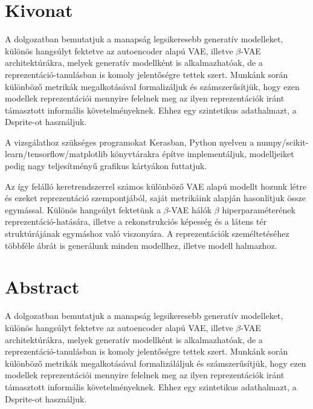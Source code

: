 \chapter*{Kivonat}

A dolgozatban bemutatjuk a manapság legsikeresebb generatív modelleket, különös hangsúlyt fektetve az autoencoder alapú VAE, illetve $\beta$-VAE architektúrákra, melyek generatív modellként is alkalmazhatóak, de a reprezentáció-tanulásban is komoly jelentőségre tettek szert. Munkánk során különböző metrikák megalkotásával formalizáljuk és számszerűsítjük, hogy ezen modellek reprezentációi mennyire felelnek meg az ilyen reprezentációk iránt támasztott informális követelményeknek. Ehhez egy szintetikus adathalmazt, a Dsprite-ot használjuk.

A vizsgálathoz szükséges programokat Kerasban, Python nyelven a numpy/scikit-learn/tensorflow/matplotlib könyvtárakra építve implementáljuk, modelljeiket pedig nagy teljesítményű grafikus kártyákon futtatjuk. 

Az így felálló keretrendszerrel számos különböző VAE alapú modellt hozunk létre és ezeket reprezentáció szempontjából, saját metrikáink alapján hasonlítjuk össze egymással. Különös hangsúlyt fektetünk a $\beta$-VAE hálók $\beta$ hiperparaméterének reprezentáció-hatására, illetve a rekonstrukciós képesség és a látens tér struktúrájának egymáshoz való viszonyára. A reprezentációk személtetéséhez többféle ábrát is generálunk minden modellhez, illetve modell halmazhoz. 

\vfill

\chapter*{Abstract}

A dolgozatban bemutatjuk a manapság legsikeresebb generatív modelleket, különös hangsúlyt fektetve az autoencoder alapú VAE, illetve $\beta$-VAE architektúrákra, melyek generatív modellként is alkalmazhatóak, de a reprezentáció-tanulásban is komoly jelentőségre tettek szert. Munkánk során különböző metrikák megalkotásával formalizáláljuk és számszerűsítjük, hogy ezen modellek reprezentációi mennyire felelnek meg az ilyen reprezentációk iránt támasztott informális követelményeknek. Ehhez egy szintetikus adathalmazt, a Dsprite-ot használjuk.

